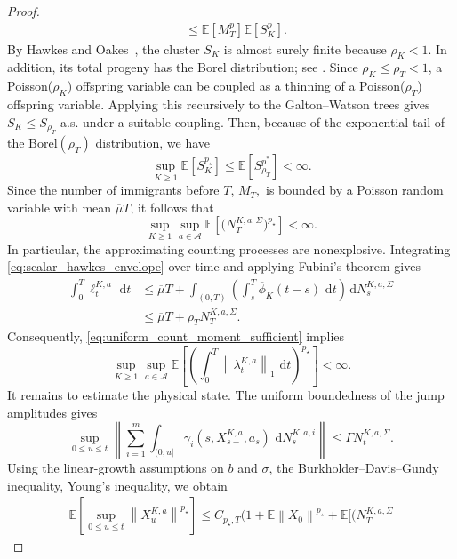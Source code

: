 \documentclass[11pt]{article}
\theoremstyle{remarkitalic}
\theoremstyle{remarkitalic}
\newcommand{\E}{\mathbb E}
\newcommand{\dd}{\,\mathrm d}
\newcommand{\1}{\mathbf 1}
\newcommand{\norm}[1]{\left\lVert #1 \right\rVert}
\begin{document}
\begin{proof}
\begin{equation*}
\begin{split}
        &\le \E[M_T^p]\E[S_{K}^p].
    \end{split}
\end{equation*} By Hawkes and Oakes~\cite[p.~496]{hawkes1974}, the cluster $S_K$ is
almost surely finite because $\rho_K<1$. In addition, its total
progeny has the Borel distribution; see
\cite{dwass1969total,tanner1961borel}. Since
$\rho_K\leq\rho_T<1$,  a Poisson($\rho_K$) offspring variable can be coupled as a thinning of a Poisson($\rho_T$) offspring variable. Applying this recursively to the Galton–Watson trees gives $S_K\le S_{\rho_T}$ a.s. under a suitable coupling. Then, because of the exponential tail
of the Borel$(\rho_T)$ distribution, we have \[
    \sup_{K\geq1}\E[S_K^{p_\star}]\le \mathbb E[S_{\rho_T}^{p^*}]<\infty.
\] Since the number of immigrants before $T$, $M_T,$ is bounded
by a Poisson random variable with mean $\overline\mu T$, it follows
that
\begin{equation}
\label{eq:uniform_count_moment_sufficient}
    \sup_{K\geq1}\sup_{a\in\mathcal A}
    \E\left[
        \bigl(N_T^{K,a,\Sigma}\bigr)^{p_\star}
    \right]
    <\infty.
\end{equation}
In particular, the approximating counting processes are
nonexplosive. Integrating \eqref{eq:scalar_hawkes_envelope} over time and applying
Fubini's theorem gives
\begin{align*}
\int_0^T\ell_t^{K,a}\,\dd t
&\leq
\overline\mu T
+
\int_{(0,T)}
\left(
    \int_s^T
    \overline\phi_K(t-s)\,\dd t
\right)
\dd N_s^{K,a,\Sigma}
\nonumber\\
&\leq
\overline\mu T
+
\rho_T N_T^{K,a,\Sigma}.
\end{align*}
Consequently, \eqref{eq:uniform_count_moment_sufficient} implies
\[
    \sup_{K\geq1}\sup_{a\in\mathcal A}
    \E\left[
        \left(
            \int_0^T
            \norm{\lambda_t^{K,a}}_1\,\dd t
        \right)^{p_\star}
    \right]
    <\infty.
\] It remains to estimate the physical state. The uniform boundedness
of the jump amplitudes gives
\[
    \sup_{0\leq u\leq t}
    \left\|
        \sum_{i=1}^m
        \int_{(0,u]}
        \gamma_i(s,X_{s-}^{K,a},a_s)
        \,\dd N_s^{K,a,i}
    \right\|
    \leq
    \Gamma N_t^{K,a,\Sigma}.
\]
Using the linear-growth assumptions on $b$ and $\sigma$, the
Burkholder--Davis--Gundy inequality, Young's inequality, we obtain
\[
\begin{aligned}
\E\left[
    \sup_{0\leq u\leq t}
    \norm{X_u^{K,a}}^{p_\star}
\right]
\leq
C_{p_\star,T}
\Bigg(
    1
    +
    \E\norm{X_0}^{p_\star}
    +
    \E\bigl[(
        N_T^{K,a,\Sigma}

\end{aligned}\]
\end{proof}
\end{document}
